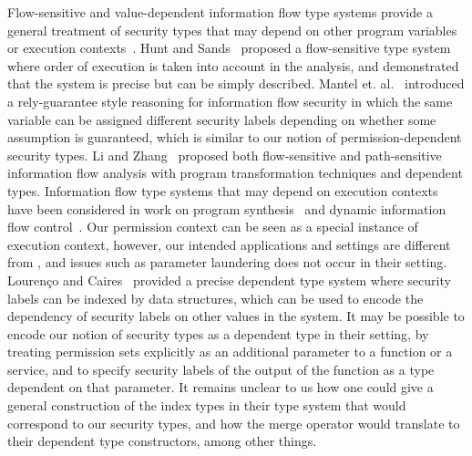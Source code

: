 {{{Flow-sensitive and value-dependent information flow type systems
provide a general treatment of security types that may depend on other
program variables or execution
contexts~\cite{Toby2016csf,Polikarpova16,Dependent_SIFUM_Type_Systems-AFP,Dependent_SIFUM_Refinement-AFP,Murray:2015jm,Li:2016jb,Zhang:2015bc,Li:2015vw,Lourenco:2015:DIF,Lourenco13,Swamy13,Yang12POPL,MantelSS11,Nanevski11,SwamyCC10,Zheng:2007cd,Tse07,Li:csf17,Hunt:2006:FST:1111037.1111045}.
Hunt and Sands~\cite{Hunt:2006:FST:1111037.1111045} proposed a
flow-sensitive type system where order of execution is taken into
account in the analysis, and demonstrated that the system is precise
but can be simply described.
Mantel et. al.~\cite{MantelSS11} introduced a rely-guarantee style
reasoning for information flow security in which the same variable can
be assigned different security labels depending on whether some
assumption is guaranteed, which is similar to our notion of
permission-dependent security types.
Li and Zhang~\cite{Li:csf17} proposed 
both flow-sensitive and path-sensitive information flow analysis with
program transformation techniques and dependent types.
Information flow type systems that may depend on execution contexts
have been considered in work on program synthesis~\cite{Polikarpova16} and
dynamic information flow control~\cite{Yang12POPL}. Our permission context can be seen as a
special instance of execution context, however, our intended
applications and settings are different from \cite{Yang12POPL,Polikarpova16},
and issues such as parameter laundering does not occur in their
setting. 
Louren\c{c}o and Caires~\cite{Lourenco:2015:DIF} provided a precise dependent type
system where security labels can be indexed by data structures, which
can be used to encode the dependency of security labels on other
values in the system.
It may be possible to encode our notion of security types as a
dependent type in their setting, by treating permission sets
explicitly as an additional parameter to a function or a service, and
to specify security labels of the output of the function as a type
dependent on that parameter. It remains unclear to us how
one could give a general construction of the index types in their type
system that would correspond to our security types, and how the merge
operator would translate to their dependent type constructors, among
other things.


}}}
